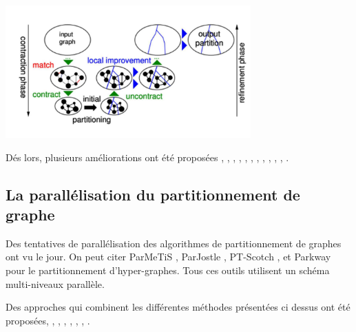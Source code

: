 	\begin{center}
		\includegraphics[height=2in]{img/multiniveaupartitionnement.png}		
		 \label{pmn}
	\end{center}
Dés lors, plusieurs améliorations ont été proposées \citep{Aurora2007}, \citep{ChevalierSafro2009}, \citep{KalayciBattiti2018}, \citep{Karypis2003}, \citep{KarypisKumar1998}, \citep{Monien2000}, \citep{Pellegrini1995}, \citep{Pope2016}, \citep{Predari2017}, \citep{Safro2015}, \citep{SandersSchulz2011}, \citep{Talu2017}.


\subsection*{La parallélisation du partitionnement de graphe}
Des tentatives de parallélisation des algorithmes de partitionnement de graphes ont vu le jour. On peut citer ParMeTiS \citep{Karypis2011}, ParJostle \citep{Walshaw2012}, PT-Scotch \citep{ChevalierPellegrini2008}, et Parkway \citep{TrifunovicKnottenbelt2004} pour le partitionnement d'hyper-graphes. Tous ces outils utilisent un schéma multi-niveaux parallèle.

Des approches qui combinent les différentes méthodes présentées ci dessus ont été proposées, \citep{Chan2016}, \citep{LaSalleKarypis2013}, \citep{LaSalleKarypis2015}, \citep{LengYu2007}, \citep{Rahimian2013}, \citep{SandersSchulz2012}, \citep{Tashkova2011}.


